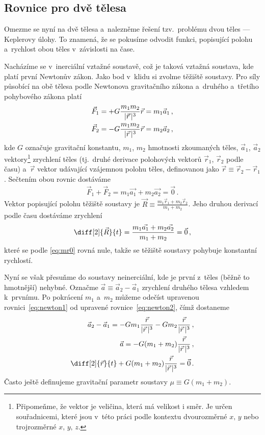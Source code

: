 \documentclass[A4paper, 12pt, oneside]{book}
\begin{document}
\subsection{Rovnice pro dvě tělesa} \label{sec:2body}
Omezme se nyní na dvě tělesa a~nalezněme řešení tzv.\ problému dvou těles --- Keplerovy úlohy. To znamená, že se pokusíme odvodit funkci, popisující polohu a~rychlost obou těles v~závislosti na čase. 

Nacházíme se v~inerciální vztažné soustavě, což je taková vztažná soustava, kde platí první Newtonův zákon. Jako bod v~klidu si zvolme těžiště soustavy. Pro síly působící na obě tělesa podle Newtonova gravitačního zákona a~druhého a~třetího pohybového zákona platí
\begin{align} 
	\vec{F}_1 &= +G\frac{m_1m_2}{\lvert \vec{r} \,\rvert^3}\vec{r} = m_1\vec{a}_1\,, \label{eq:newton1} \\
	\vec{F}_2 &= -G\frac{m_1m_2}{\lvert \vec{r} \,\rvert^3}\vec{r} = m_2\vec{a}_2\,, \label{eq:newton2}
\end{align}
kde $G$ označuje gravitační konstantu, $m_1$, $m_2$ hmotnosti zkoumaných těles, $\vec{a}_1$, $\vec{a}_2$ vektory\footnote{Připomeňme, že vektor je veličina, která má velikost i směr. Je určen souřadnicemi, které jsou v~této práci podle kontextu dvourozměrné $x,\,y$ nebo trojrozměrné $x,\,y,\,z$.}  zrychlení těles (tj.\ druhé derivace polohových vektorů $\vec{r}_1$, $\vec{r}_2$ podle času) a~$\vec{r}$ vektor udávající vzájemnou polohu těles, definovanou jako $\vec{r} \equiv \vec{r}_2 - \vec{r}_1$. Sečtením obou rovnic dostáváme
\begin{align} \label{eq:mr0}
	\vec{F}_1 + \vec{F}_2 = m_1\vec{a_1} + m_2\vec{a_2} = \vec{0}\,.
\end{align}
Vektor popisující polohu těžiště soustavy je $\vec{R} \equiv \frac{m_1\vec{r}_1 + m_2\vec{r}_2}{m_1 + m_2}$. Jeho druhou derivací podle času dostáváme zrychlení
\begin{align}
	\diff[2]{\vec{R}}{t} = \frac{m_1\vec{a_1} + m_2\vec{a_2}}{m_1+m_2} = \vec{0}\,,
\end{align}
které se podle \eqref{eq:mr0} rovná nule, takže se těžiště soustavy pohybuje konstantní rychlostí.

Nyní se však přesuňme do soustavy neinerciální, kde je první z~těles (běžně to hmotnější) nehybné. Označme $\vec{a}\equiv\vec{a}_2-\vec{a}_1$ zrychlení druhého tělesa vzhledem k~prvnímu. Po pokrácení $m_1$ a~$m_2$ můžeme odečíst upravenou rovnici~\eqref{eq:newton1} od upravené rovnice~\eqref{eq:newton2}, čímž dostaneme
\begin{align}
	\nonumber \vec{a}_2 - \vec{a}_1 = -Gm_1\frac{\vec{r}}{\abs{\vec{r}}^3}-Gm_2\frac{\vec{r}}{\abs{\vec{r}}^3}\,, \\
	\nonumber \vec{a} = -G(m_1+m_2)\frac{\vec{r}}{\abs{\vec{r}}^3}\,, \\
		\diff[2]{\vec{r}}{t} + G(m_1+m_2)\frac{\vec{r}}{\abs{\vec{r}}^3} = \vec{0}\,. \label{eq:eqmotion}
\end{align}
Často ještě definujeme gravitační parametr soustavy $\mu\equiv G(m_1+m_2)$.
\end{document}
